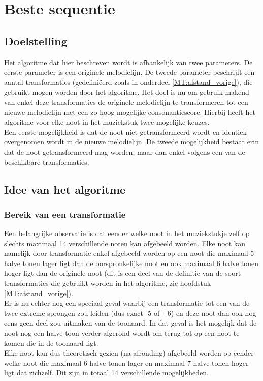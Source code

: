 \section{Beste sequentie}
\label{ETT:algo1}

\subsection{Doelstelling}
Het algoritme dat hier beschreven wordt is afhankelijk van twee parameters. De eerste parameter is een originele melodielijn. De tweede parameter beschrijft een aantal transformaties (gedefini\"eerd zoals in onderdeel \ref{MT:afstand_vorige}), die gebruikt mogen worden door het algoritme. Het doel is nu om gebruik makend van enkel deze transformaties de originele melodielijn te transformeren tot een nieuwe melodielijn met een zo hoog mogelijke consonantiescore. Hierbij heeft het algoritme voor elke noot in het muziekstuk twee mogelijke keuzes.\\ 
Een eerste mogelijkheid is dat de noot niet getransformeerd wordt en identiek overgenomen wordt in de nieuwe melodielijn. De tweede mogelijkheid bestaat erin dat de noot getransformeerd mag worden, maar dan enkel volgens een van de beschikbare transformaties.

\subsection{Idee van het algoritme}
\subsubsection{Bereik van een transformatie}
Een belangrijke observatie is dat eender welke noot in het muziekstukje zelf op slechts maximaal 14 verschillende noten kan afgebeeld worden. Elke noot kan namelijk door transformatie enkel afgebeeld worden op een noot die maximaal 5 halve tonen lager ligt dan de oorspronkelijke noot en ook maximaal 6 halve tonen hoger ligt dan de originele noot (dit is een deel van de definitie van de soort transformaties die gebruikt worden in het algoritme, zie hoofdstuk \ref{MT:afstand_vorige}).\\ 
Er is nu echter nog een speciaal geval waarbij een transformatie tot een van de twee extreme sprongen zou leiden (dus exact -5 of +6) en deze noot dan ook nog eens geen deel zou uitmaken van de toonaard. In dat geval is het mogelijk dat de noot nog een halve toon verder afgerond wordt om terug tot op een noot te komen die in de toonaard ligt.\\ 
Elke noot kan dus theoretisch gezien (na afronding) afgebeeld worden op eender welke noot die maximaal 6 halve tonen lager en maximaal 7 halve tonen hoger ligt dat zichzelf. Dit zijn in totaal 14 verschillende mogelijkheden.

